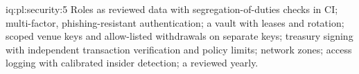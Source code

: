 \begin{solution}{iq:pl:security:5}
Roles as reviewed data with segregation-of-duties checks in CI; multi-factor, phishing-resistant authentication; a vault with leases and
rotation; scoped venue keys and allow-listed withdrawals on separate keys; treasury signing with independent transaction verification and
policy limits; network zones; access logging with calibrated insider detection; a  reviewed yearly.
\end{solution}
